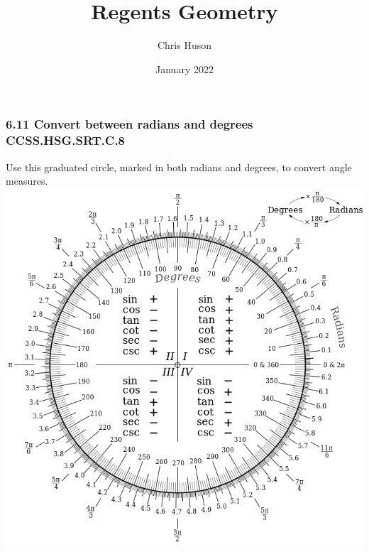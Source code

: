 \documentclass[12pt, twoside]{article}
\title{Regents Geometry}
\author{Chris Huson}
\date{January 2022}
\begin{document}
\subsubsection*{6.11 Convert between radians and degrees \hfill CCSS.HSG.SRT.C.8}

Use this graduated circle, marked in both radians and degrees, to convert angle measures.\\
\includegraphics[width=16cm]{Degree-Radian_Conversion.png}
\end{document}
